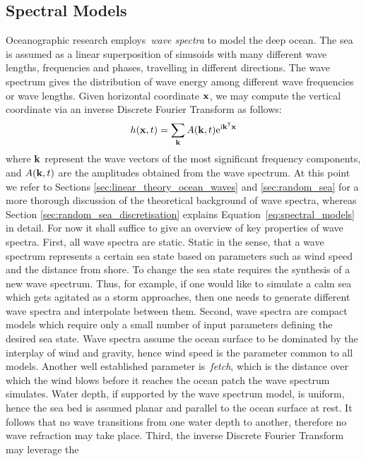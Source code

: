 \subsection{Spectral Models}
Oceanographic research employs~\emph{wave spectra} to model the deep ocean. The
sea is assumed as a linear superposition of sinusoids with many different wave
lengths, frequencies and phases, travelling in different directions. The wave
spectrum gives the distribution of wave energy among different wave frequencies
or wave lengths. Given horizontal coordinate $\mathbf{x}$, we may compute the
vertical coordinate via an inverse Discrete Fourier Transform as follows:
\begin{equation}
h(\mathbf{x},t) = \sum_{\mathbf{k}}A(\mathbf{k},t)\mathrm{e}^{\mathrm{i}\mathbf{k}^{\mathsf{T}}\mathbf{x}}
\label{eq:spectral_models}
\end{equation}
where $\mathbf{k}$ represent the wave vectors of the most significant frequency
components, and $A(\mathbf{k},t)$ are the amplitudes obtained from the wave
spectrum. At this point we refer to Sections \ref{sec:linear_theory_ocean_waves}
and \ref{sec:random_sea} for a more thorough discussion of the theoretical
background of wave spectra, whereas Section \ref{sec:random_sea_discretisation}
explains Equation~\ref{eq:spectral_models} in detail. For now it shall suffice
to give an overview of key properties of wave spectra. First, all wave spectra
are static. Static in the sense, that a wave spectrum represents a certain sea
state based on parameters such as wind speed and the distance from shore. To
change the sea state requires the synthesis of a new wave spectrum. Thus, for
example, if one would like to simulate a calm sea which gets agitated as a storm
approaches, then one needs to generate different wave spectra and interpolate
between them. Second, wave spectra are compact models which require only a small
number of input parameters defining the desired sea state. Wave spectra assume
the ocean surface to be dominated by the interplay of wind and gravity, hence
wind speed is the parameter common to all models. Another well established
parameter is~\emph{fetch}, which is the distance over which the wind blows
before it reaches the ocean patch the wave spectrum simulates. Water depth,
if supported by the wave spectrum model, is uniform, hence the sea bed is
assumed planar and parallel to the ocean surface at rest. It follows that no
wave transitions from one water depth to another, therefore no wave refraction
may take place. Third, the inverse Discrete Fourier Transform may leverage the
